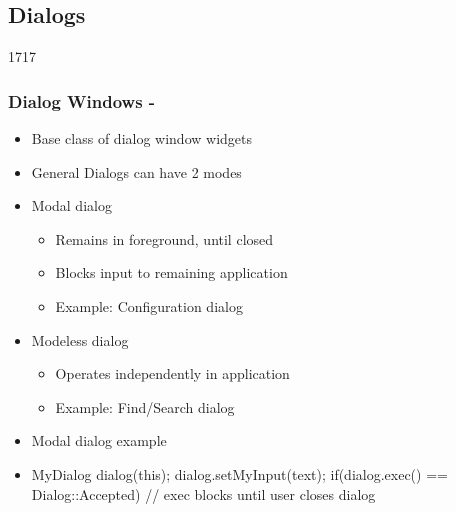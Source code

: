 %
%
%
%

\subsection{Dialogs}

\begin{slide}[fragile]{1717}\frametitle{Dialog Windows - }
  \begin{itemize}
  \item Base class of dialog window widgets
  \item General Dialogs can have 2 modes
  \item Modal dialog
  \begin{itemize}
  \item Remains in foreground, until closed
 \item Blocks input to remaining application
 \item Example: Configuration dialog
   \end{itemize}
  \item Modeless dialog
  \begin{itemize}
  \item Operates independently in application
   \item Example: Find/Search dialog
   \end{itemize}
  \item Modal dialog example
 \item[] 
    \begin{cpp}
MyDialog dialog(this);
dialog.setMyInput(text);
if(dialog.exec() == Dialog::Accepted) {
  // exec blocks until user closes dialog
}
    \end{cpp}
  \end{itemize}
\end{slide}

